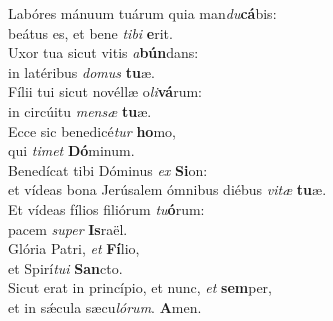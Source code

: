 \evenverse Labóres mánuum tuárum quia man\textit{du}\textbf{cá}bis:~\*\\
\evenverse beátus es, et bene \textit{ti}\textit{bi} \textbf{e}rit.\\
\oddverse Uxor tua sicut vitis \textit{a}\textbf{bún}dans:~\*\\
\oddverse in latéribus \textit{do}\textit{mus} \textbf{tu}æ.\\
\evenverse Fílii tui sicut novéllæ o\textit{li}\textbf{vá}rum:~\*\\
\evenverse in circúitu \textit{men}\textit{sæ} \textbf{tu}æ.\\
\oddverse Ecce sic benedicé\textit{tur} \textbf{ho}mo,~\*\\
\oddverse qui \textit{ti}\textit{met} \textbf{Dó}minum.\\
\evenverse Benedícat tibi Dóminus \textit{ex} \textbf{Si}on:~\*\\
\evenverse et vídeas bona Jerúsalem ómnibus diébus \textit{vi}\textit{tæ} \textbf{tu}æ.\\
\oddverse Et vídeas fílios filiórum \textit{tu}\textbf{ó}rum:~\*\\
\oddverse pacem \textit{su}\textit{per} \textbf{Is}raël.\\
\evenverse Glória Patri, \textit{et} \textbf{Fí}lio,~\*\\
\evenverse et Spirí\textit{tu}\textit{i} \textbf{San}cto.\\
\oddverse Sicut erat in princípio, et nunc, \textit{et} \textbf{sem}per,~\*\\
\oddverse et in sǽcula sæcu\textit{ló}\textit{rum}. \textbf{A}men.\\
